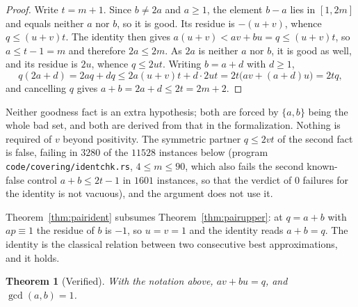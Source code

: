 \documentclass[11pt]{amsart}
\theoremstyle{plain}
\newtheorem{theorem}{Theorem}[section]
\theoremstyle{definition}
\begin{document}
\begin{proof}
Write $t = m+1$. Since $b \ne 2a$ and $a \ge 1$, the element $b-a$ lies in $[1,2m]$ and equals
neither $a$ nor $b$, so it is good. Its residue is $-(u+v)$, whence $q \le (u+v)t$. The identity
then gives $a(u+v) < av + bu = q \le (u+v)t$, so $a \le t - 1 = m$ and therefore $2a \le 2m$. As
$2a$ is neither $a$ nor $b$, it is good as well, and its residue is $2u$, whence $q \le 2ut$.
Writing $b = a+d$ with $d \ge 1$,
\[
  q(2a+d) = 2aq + dq \le 2a(u+v)t + d\cdot 2ut = 2t\bigl(av + (a+d)u\bigr) = 2tq ,
\]
and cancelling $q$ gives $a + b = 2a + d \le 2t = 2m+2$.
\end{proof}

Neither goodness fact is an extra hypothesis; both are forced by $\{a,b\}$ being the whole bad set,
and both are derived from that in the formalization. Nothing is required of $v$ beyond positivity.
The symmetric partner $q \le 2vt$ of the second fact is false, failing in $3280$ of the $11528$
instances below (program \texttt{code/covering/identchk.rs}, $4\le m\le90$, which also fails the second known-false control $a+b\le 2t-1$ in $1601$ instances, so that the verdict of $0$ failures for the identity is not vacuous), and the argument does not use it.

Theorem~\ref{thm:pairident} subsumes Theorem~\ref{thm:pairupper}: at $q = a+b$ with $ap \equiv 1$
the residue of $b$ is $-1$, so $u = v = 1$ and the identity reads $a + b = q$. The identity is the
classical relation between two consecutive best approximations, and it holds.

\begin{theorem}[Verified]\label{thm:identity}
With the notation above, $av + bu = q$, and $\gcd(a,b) = 1$.
\end{theorem}
\end{document}
